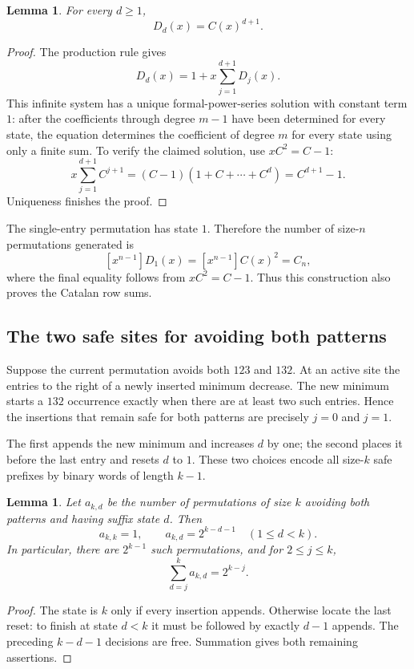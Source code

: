 \documentclass[11pt]{article}
\numberwithin{equation}{section}
\newtheorem{lemma}[theorem]{Lemma}
\theoremstyle{definition}
\begin{document}
\begin{lemma}\label{fpf:lem:descendants}
For every $d\ge1$,
\begin{equation}\label{fpf:eq:descendants}
 D_d(x)=C(x)^{d+1}.
\end{equation}
\end{lemma}
\begin{proof}
The production rule gives
\[
 D_d(x)=1+x\sum_{j=1}^{d+1}D_j(x).
\]
This infinite system has a unique formal-power-series solution with constant
term $1$: after the coefficients through degree $m-1$ have been determined
for every state, the equation determines the coefficient of degree $m$
for every state using only a finite sum. To verify the claimed solution,
use $xC^2=C-1$:
\[
 x\sum_{j=1}^{d+1}C^{j+1}
 =(C-1)(1+C+\cdots+C^d)=C^{d+1}-1.
\]
Uniqueness finishes the proof.
\end{proof}
The single-entry permutation has state $1$. Therefore the number of
size-$n$ permutations generated is
\[
 [x^{n-1}]D_1(x)=[x^{n-1}]C(x)^2=C_n,
\]
where the final equality follows from $xC^2=C-1$. Thus this construction
also proves the Catalan row sums.

\subsection{The two safe sites for avoiding both patterns}
Suppose the current permutation avoids both $123$ and $132$. At an active
site the entries to the right of a newly inserted minimum decrease. The new
minimum starts a $132$ occurrence exactly when there are at least two such
entries. Hence the insertions that remain safe for both patterns are
precisely $j=0$ and $j=1$.

The first appends the new minimum and increases $d$ by one; the second places
it before the last entry and resets $d$ to $1$. These two choices encode
all size-$k$ safe prefixes by binary words of length $k-1$.

\begin{lemma}\label{fpf:lem:safe-count}
Let $a_{k,d}$ be the number of permutations of size $k$ avoiding both
patterns and having suffix state $d$. Then
\begin{equation}\label{fpf:eq:safe-count}
 a_{k,k}=1,\qquad a_{k,d}=2^{k-d-1}\quad(1\le d<k).
\end{equation}
In particular, there are $2^{k-1}$ such permutations, and for $2\le j\le k$,
\begin{equation}\label{fpf:eq:safe-tail}
 \sum_{d=j}^k a_{k,d}=2^{k-j}.
\end{equation}
\end{lemma}
\begin{proof}
The state is $k$ only if every insertion appends. Otherwise locate the last
reset: to finish at state $d<k$ it must be followed by exactly $d-1$
appends. The preceding $k-d-1$ decisions are free. Summation gives both
remaining assertions.
\end{proof}
\end{document}
